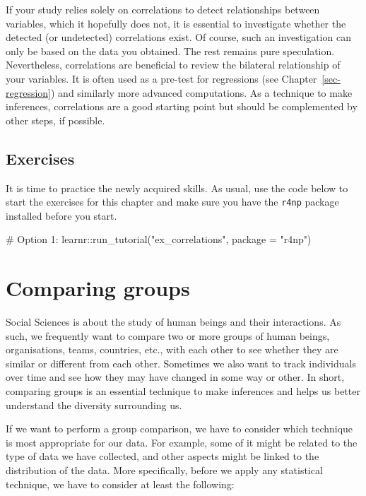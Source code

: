 \documentclass[
  letterpaper,
  DIV=11,
  numbers=noendperiod]{scrreprt}
\newenvironment{Shaded}{\begin{snugshade}}{\end{snugshade}}
\newcommand{\AttributeTok}[1]{\textcolor[rgb]{0.40,0.45,0.13}{#1}}
\newcommand{\CommentTok}[1]{\textcolor[rgb]{0.37,0.37,0.37}{#1}}
\newcommand{\FunctionTok}[1]{\textcolor[rgb]{0.28,0.35,0.67}{#1}}
\newcommand{\NormalTok}[1]{\textcolor[rgb]{0.00,0.23,0.31}{#1}}
\newcommand{\SpecialCharTok}[1]{\textcolor[rgb]{0.37,0.37,0.37}{#1}}
\newcommand{\StringTok}[1]{\textcolor[rgb]{0.13,0.47,0.30}{#1}}
\begin{document}
If your study relies solely on correlations to detect relationships
between variables, which it hopefully does not, it is essential to
investigate whether the detected (or undetected) correlations exist. Of
course, such an investigation can only be based on the data you
obtained. The rest remains pure speculation. Nevertheless, correlations
are beneficial to review the bilateral relationship of your variables.
It is often used as a pre-test for regressions (see
Chapter~\ref{sec-regression}) and similarly more advanced computations.
As a technique to make inferences, correlations are a good starting
point but should be complemented by other steps, if possible.

\section{Exercises}\label{sec-exercises-correlations}

It is time to practice the newly acquired skills. As usual, use the code
below to start the exercises for this chapter and make sure you have the
\texttt{r4np} package installed before you start.

\begin{Shaded}
\begin{Highlighting}[]
\CommentTok{\# Option 1:}
\NormalTok{learnr}\SpecialCharTok{::}\FunctionTok{run\_tutorial}\NormalTok{(}\StringTok{"ex\_correlations"}\NormalTok{, }\AttributeTok{package =} \StringTok{"r4np"}\NormalTok{)}
\end{Highlighting}
\end{Shaded}


\chapter{Comparing groups}\label{sec-comparing-groups}

Social Sciences is about the study of human beings and their
interactions. As such, we frequently want to compare two or more groups
of human beings, organisations, teams, countries, etc., with each other
to see whether they are similar or different from each other. Sometimes
we also want to track individuals over time and see how they may have
changed in some way or other. In short, comparing groups is an essential
technique to make inferences and helps us better understand the
diversity surrounding us.

If we want to perform a group comparison, we have to consider which
technique is most appropriate for our data. For example, some of it
might be related to the type of data we have collected, and other
aspects might be linked to the distribution of the data. More
specifically, before we apply any statistical technique, we have to
consider at least the following:
\end{document}
